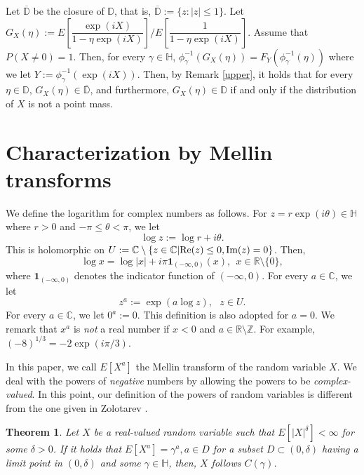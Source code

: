 \documentclass[a4paper, reqno, 11pt]{amsart}
\newtheorem{Thm}{Theorem}[section]
\theoremstyle{definition}
\begin{document}
Let $\overline{\mathbb{D}}$ be the closure of $\mathbb{D}$, that is, $\overline{\mathbb{D}} := \{z : |z| \le 1\}$. 
Let 
$G_X (\eta) := E\left[ \dfrac{\exp(iX)}{ 1 - \eta \exp(iX)} \right]/E\left[ \dfrac{1}{1 - \eta  \exp(iX)} \right]$. 
Assume that $P(X \ne 0) = 1$. %
Then, for every $\gamma \in \mathbb{H}$, 
$\phi^{-1}_{\gamma} \left( G_X (\eta)\right) = F_Y (\phi^{-1}_{\gamma} ( \eta ))$ where we let $Y := \phi_{\gamma}^{-1}(\exp(iX))$. 
Then, by Remark \ref{upper}, it holds that for every $\eta \in \mathbb{D}$, $G_X (\eta) \in \overline{\mathbb D}$, and furthermore, 
$G_X (\eta) \in \mathbb D$ if and only if the distribution of $X$ is not a point mass.  



\section{Characterization by Mellin transforms}

We define the logarithm for complex numbers as follows. 
For $z = r \exp(i \theta) \in \mathbb H$ where $r > 0$ and $-\pi \le \theta < \pi$, 
we let 
\[ \log z := \log r + i \theta.  \]
This is holomorphic on $U := \mathbb{C} \setminus \left\{z \in \mathbb{C} | \textup{Re}(z) \le 0, \textup{Im}(z) = 0 \right\}$. 
Then, 
\begin{equation}\label{def-log} 
\log x = \log |x| + i \pi \mathbf{1}_{(-\infty, 0)}(x), \ \ x \in \mathbb{R} \setminus \{0\}, 
\end{equation}
where $\mathbf{1}_{(-\infty, 0)}$ denotes the indicator function of $(-\infty,0)$. 
For every $a \in \mathbb{C}$, we let 
\[ z^{a} := \exp(a \log z), \ \ \ z \in U. \]
For every $a \in \mathbb{C}$, we let $0^a := 0$. 
This definition is also adopted for $a = 0$. 
We remark that $x^{a}$ is {\it not} a real number if $x < 0$ and $a \in \mathbb{R} \setminus \mathbb{Z}$. %
For example, $(-8)^{1/3} = -2 \exp(i \pi/3)$. %


In this paper, we call $E[X^a]$ the Mellin transform of the random variable $X$. 
We deal with the powers of {\it negative} numbers by allowing the powers to be {\it complex-valued}.  
In this point, our definition of  the powers of  random variables  is different from the one given in Zolotarev \cite[(3.0.4)]{Zolotarev1986}.  


\begin{Thm}\label{power} 
Let $X$ be a real-valued random variable such that $E\left[|X|^{\delta}\right] < \infty$  for some $\delta > 0$. 
If it holds that $E[X^a] = \gamma^a, a \in D$ for  a subset $D \subset (0, \delta)$ having a limit point in $(0, \delta)$ and some $\gamma \in \mathbb{H}$, 
then, $X$ follows  $C(\gamma)$. 
\end{Thm}
\end{document}
